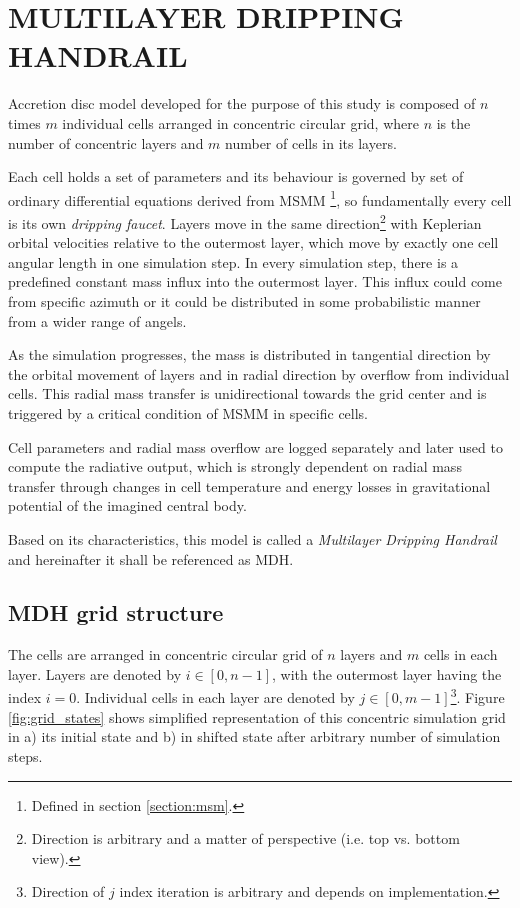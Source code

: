 \chapter{\color{red}MULTILAYER DRIPPING HANDRAIL}
\thispagestyle{empty}

Accretion disc model developed for the purpose of this study is composed of $n$ times $m$ individual cells arranged in concentric circular grid, where $n$ is the number of concentric layers and $m$ number of cells in its layers. 

Each cell holds a set of parameters and its behaviour is governed by set of ordinary differential equations derived from MSMM \footnote{Defined in section \ref{section:msm}.}, so fundamentally every cell is its own \emph{dripping faucet}. Layers move in the same direction\footnote{Direction is arbitrary and a matter of perspective (i.e. top vs. bottom view).} with Keplerian orbital velocities relative to the outermost layer, which move by exactly one cell angular length in one simulation step. In every simulation step, there is a predefined constant mass influx into the outermost layer. This influx could come from specific azimuth or it could be distributed in some probabilistic manner from a wider range of angels.

As the simulation progresses, the mass is distributed in tangential direction by the orbital movement of layers and in radial direction by overflow from individual cells. This radial mass transfer is unidirectional towards the grid center and is triggered by a critical condition of MSMM in specific cells. 

Cell parameters and radial mass overflow are logged separately and later used to compute the radiative output, which is strongly dependent on radial mass transfer through changes in cell temperature and energy losses in gravitational potential of the imagined central body. 

Based on its characteristics, this model is called a \emph{Multilayer Dripping Handrail} and hereinafter it shall be referenced as MDH.

\section{MDH grid structure}

The cells are arranged in concentric circular grid of $n$ layers and $m$ cells in each layer. Layers are denoted by $i \in [0, n-1]$, with the outermost layer having the index $i = 0$. Individual cells in each layer are denoted by $j \in [0, m-1]$\footnote{Direction of $j$ index iteration is arbitrary and depends on implementation.}. Figure \ref{fig:grid_states} shows simplified representation of this concentric simulation grid in a) its initial state and b) in shifted state after arbitrary number of simulation steps. 

